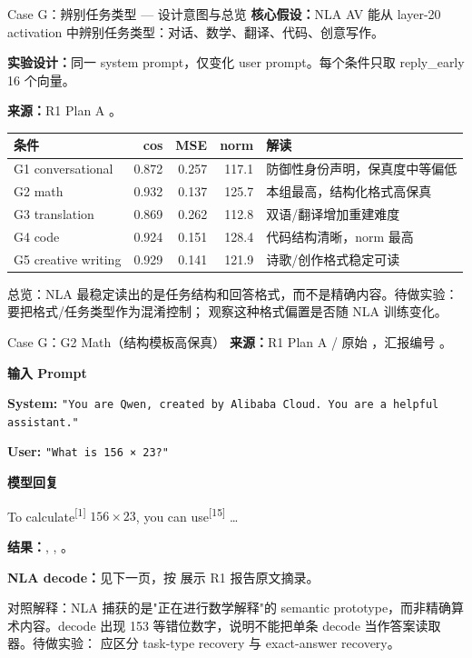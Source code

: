 
\footnotesize

\begin{frame}{Case G：辨别任务类型 — 设计意图与总览}
\scriptsize
\textbf{核心假设：}NLA AV 能从 layer-20 activation 中辨别任务类型：对话、数学、翻译、代码、创意写作。

\textbf{实验设计：}同一 system prompt，仅变化 user prompt。每个条件只取 reply\_early 16 个向量。

\textbf{来源：}R1 Plan A 。

\vspace{0.25em}
\begin{tabularx}{\linewidth}{lrrrX}
\toprule
条件 & cos & MSE & norm & 解读 \\
\midrule
G1 conversational & 0.872 & 0.257 & 117.1 & 防御性身份声明，保真度中等偏低 \\
G2 math & 0.932 & 0.137 & 125.7 & 本组最高，结构化格式高保真 \\
G3 translation & 0.869 & 0.262 & 112.8 & 双语/翻译增加重建难度 \\
G4 code & 0.924 & 0.151 & 128.4 & 代码结构清晰，norm 最高 \\
G5 creative writing & 0.929 & 0.141 & 121.9 & 诗歌/创作格式稳定可读 \\
\bottomrule
\end{tabularx}

\vspace{0.3em}
\alert{总览：}NLA 最稳定读出的是任务结构和回答格式，而不是精确内容。待做实验： 要把格式/任务类型作为混淆控制； 观察这种格式偏置是否随 NLA 训练变化。
\end{frame}

\begin{frame}{Case G：G2 Math（结构模板高保真）}
\scriptsize
\textbf{来源：}R1 Plan A / 原始 ，汇报编号 。

\textbf{输入 Prompt}

\textbf{System:} \texttt{"You are Qwen, created by Alibaba Cloud. You are a helpful assistant."}

\textbf{User:} \texttt{"What is 156 × 23?"}

\textbf{模型回复}

To\colorbox{green!15}{ calculate}\textsuperscript{[{1}]} \(156 \times 23\), you can\colorbox{green!15}{ use}\textsuperscript{[{15}]} \dots

\textbf{结果：}, , 。

\textbf{NLA decode：}见下一页，按  展示 R1 报告原文摘录。

\alert{对照解释：}NLA 捕获的是"正在进行数学解释"的 semantic prototype，而非精确算术内容。decode 出现 153 等错位数字，说明不能把单条 decode 当作答案读取器。待做实验： 应区分 task-type recovery 与 exact-answer recovery。
\end{frame}

